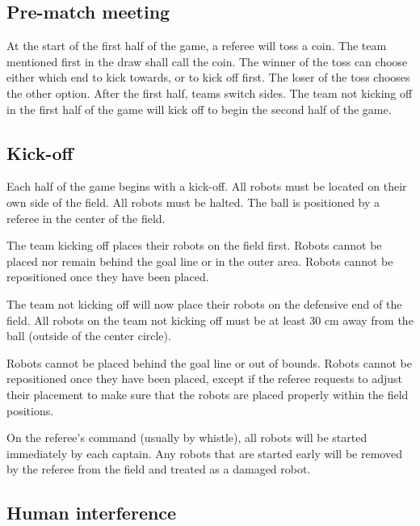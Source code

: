 \documentclass{article}
\begin{document}
\subsection{Pre-match meeting \label{ref-003}}

At the start of the first half of the game, a referee will toss a coin. The
team mentioned first in the draw shall call the coin. The winner of the toss
can choose either which end to kick towards, or to kick off first. The loser of the
toss chooses the other option. After the first half, teams switch sides.
The team not kicking off in the first half of the game will kick off to
begin the second half of the game.


\subsection{Kick-off \label{ref-004}}

Each half of the game begins with a kick-off. All robots must be located on
their own side of the field. All robots must be halted. The ball is positioned
by a referee in the center of the field.

The team kicking off places their robots on the field first. Robots cannot be
placed nor remain behind the goal line or in the outer area. Robots cannot be
repositioned once they have been placed.

The team not kicking off will now place their robots on the defensive end of
the field. All robots on the team not kicking off must be at least 30 cm away
from the ball (outside of the center circle).

Robots cannot be placed behind the goal line or out of bounds.
Robots cannot be repositioned once they have been placed, except if the referee
requests to adjust their placement to make sure that the robots are placed
properly within the field positions.

On the referee's command (usually by whistle), all robots will be started
immediately by each captain. Any robots that are started early will be removed
by the referee from the field and treated as a damaged robot.

\subsection{Human interference\label{ref-005}}
\end{document}
